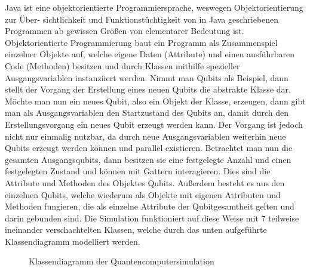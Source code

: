 \documentclass[12pt]{report}
\begin{document}
Java ist eine objektorientierte Programmiersprache, weswegen Objektorientierung zur
Über-
sichtlichkeit und Funktionstüchtigkeit von in Java geschriebenen Programmen ab gewissen Größen von elementarer Bedeutung ist.
Objektorientierte Programmierung baut ein Programm als Zusammenspiel einzelner Objekte auf, welche eigene Daten (Attribute) und einen ausführbaren Code (Methoden) besitzen und durch Klassen mithilfe spezieller Ausgangsvariablen instanziiert werden. Nimmt man Qubits als Beispiel, dann stellt der Vorgang der Erstellung eines neuen Qubits die abstrakte Klasse dar. Möchte man nun ein neues Qubit, also ein Objekt der Klasse, erzeugen, dann gibt man als Ausgangsvariablen den Startzustand des Qubits an, damit durch den Erstellungsvorgang ein neues Qubit erzeugt werden kann.  Der Vorgang ist jedoch nicht nur einmalig nutzbar, da durch neue Ausgangsvariablen weiterhin neue Qubits erzeugt werden können und parallel existieren.
Betrachtet man nun die gesamten Ausgangsqubits, dann besitzen sie eine festgelegte Anzahl und  einen festgelegten Zustand und können mit Gattern interagieren. Dies sind die Attribute und Methoden des Objektes \glqq Qubits\grqq. Außerdem besteht es aus den einzelnen Qubits, welche wiederum als Objekte mit eigenen Attributen und Methoden fungieren, die als einzelne Attribute der Qubitgesamtheit gelten und darin gebunden sind.
Die Simulation funktioniert auf diese Weise mit 7 teilweise ineinander verschachtelten Klassen, welche durch das unten aufgeführte Klassendiagramm modelliert werden.


\begin{figure}
	\centering
	\vspace{-1.8cm}
	\centering
	\caption{Klassendiagramm der Quantencomputersimulation}
\end{figure}

\newpage
\end{document}
